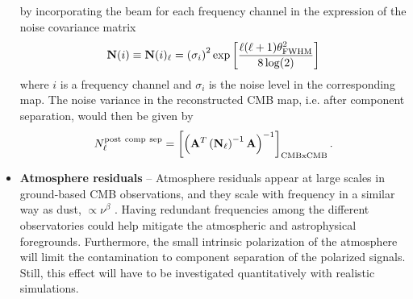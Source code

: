 \begin{itemize}
by incorporating the beam for each frequency channel in the expression of the noise covariance matrix 
	\begin{eqnarray}
		\centering
			\mathbf{N}(i) \equiv \mathbf{N}(i)_\ell = \left( \sigma_i\right)^2\exp\left[ \frac{\ell(\ell+1)\theta_{\rm FWHM}^2}{8\log(2)} \right]
	\end{eqnarray}
	where $i$ is a frequency channel and $\sigma_i$ is the noise level in the corresponding map. The noise variance in the reconstructed CMB map, i.e. after component separation, would then be given by
	\begin{eqnarray}
		\centering
			N_\ell^{\rm post\ comp\ sep} = \left[\left(\mathbf{A}^T\left(\mathbf{N}_\ell\right)^{-1}\mathbf{A}\right)^{-1}\right]_{\rm CMBxCMB}.
	\end{eqnarray}
	\item \textbf{Atmosphere residuals} -- Atmosphere residuals appear at large scales in ground-based CMB observations, and they scale with frequency in a similar way as dust, $\propto \nu^\beta$ \cite{Errard:2015twg}. Having redundant frequencies among the different observatories could help mitigate the atmospheric and astrophysical foregrounds. Furthermore, the small intrinsic polarization of the atmosphere \cite{Battistelli:2012we,Errard:2015twg} will
limit the contamination to component separation of the polarized signals.
Still, this effect will have to be investigated quantitatively with realistic simulations.
\end{itemize}




%

